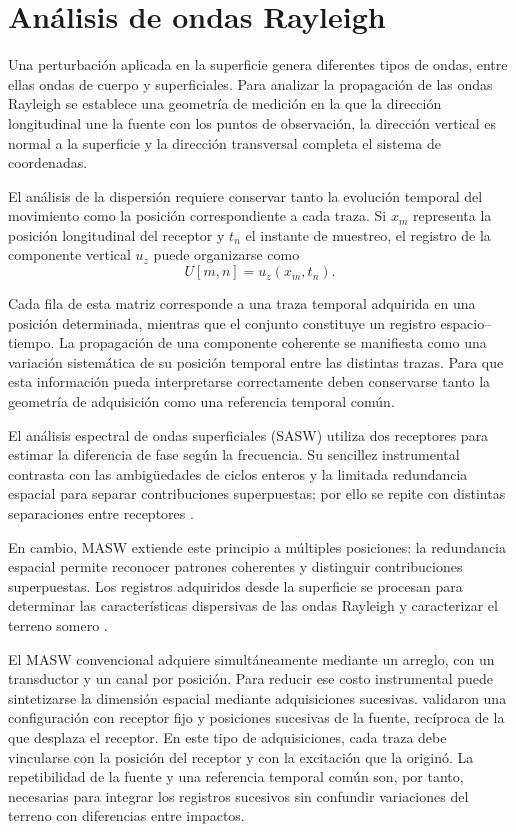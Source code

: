 \section{Análisis de ondas Rayleigh}
\label{sec:metodologia}

Una perturbación aplicada en la superficie genera diferentes tipos de ondas, entre ellas ondas de cuerpo y superficiales. Para analizar la propagación de las ondas Rayleigh se establece una geometría de medición en la que la dirección longitudinal une la fuente con los puntos de observación, la dirección vertical es normal a la superficie y la dirección transversal completa el sistema de coordenadas.

El análisis de la dispersión requiere conservar tanto la evolución temporal del movimiento como la posición correspondiente a cada traza. Si $x_m$ representa la posición longitudinal del receptor y $t_n$ el instante de muestreo, el registro de la componente vertical $u_z$ puede organizarse como
\begin{equation}
	U[m,n]=u_z(x_m,t_n).
	\label{eq:registro-xt}
\end{equation}

Cada fila de esta matriz corresponde a una traza temporal adquirida en una posición determinada, mientras que el conjunto constituye un registro espacio--tiempo. La propagación de una componente coherente se manifiesta como una variación sistemática de su posición temporal entre las distintas trazas. Para que esta información pueda interpretarse correctamente deben conservarse tanto la geometría de adquisición como una referencia temporal común.

El análisis espectral de ondas superficiales (SASW) utiliza dos receptores para estimar la diferencia de fase según la frecuencia. Su sencillez instrumental contrasta con las ambigüedades de ciclos enteros y la limitada redundancia espacial para separar contribuciones superpuestas; por ello se repite con distintas separaciones entre receptores \citep{Foti2014}.

En cambio, MASW extiende este principio a múltiples posiciones: la redundancia espacial permite reconocer patrones coherentes y distinguir contribuciones superpuestas. Los registros adquiridos desde la superficie se procesan para determinar las características dispersivas de las ondas Rayleigh y caracterizar el terreno somero \citep{Park1998,Park1999,Foti2018}.

El MASW convencional adquiere simultáneamente mediante un arreglo, con un transductor y un canal por posición. Para reducir ese costo instrumental puede sintetizarse la dimensión espacial mediante adquisiciones sucesivas. \citet{LinAshlock2016} validaron una configuración con receptor fijo y posiciones sucesivas de la fuente, recíproca de la que desplaza el receptor. En este tipo de adquisiciones, cada traza debe vincularse con la posición del receptor y con la excitación que la originó. La repetibilidad de la fuente y una referencia temporal común son, por tanto, necesarias para integrar los registros sucesivos sin confundir variaciones del terreno con diferencias entre impactos.

